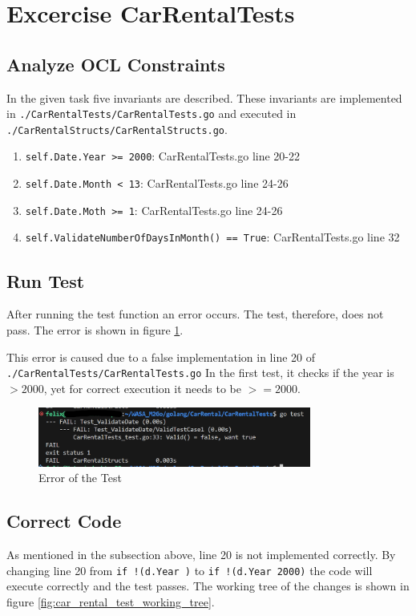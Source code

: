 \section{Excercise CarRentalTests}
\subsection*{Analyze OCL Constraints}
In the given task five invariants are described.
These invariants are implemented in \texttt{./CarRentalTests/CarRentalTests.go} and executed in \texttt{./CarRentalStructs/CarRentalStructs.go}.
\begin{enumerate}
    \item \texttt{self.Date.Year >= 2000}: CarRentalTests.go line 20-22
    \item \texttt{self.Date.Month < 13}: CarRentalTests.go line 24-26
    \item \texttt{self.Date.Moth >= 1}: CarRentalTests.go line 24-26
    \item \texttt{self.ValidateNumberOfDaysInMonth() == True}: CarRentalTests.go line 32
\end{enumerate}

\subsection*{Run Test}
After running the test function an error occurs. 
The test, therefore, does not pass.
The error is shown in figure \ref{fig:car_rental_test_error}.

This error is caused due to a false implementation in line 20 of \texttt{./CarRentalTests/CarRentalTests.go}
In the first test, it checks if the year is $>2000$, yet for correct execution it needs to be $>=2000$.

\begin{figure}[H]
    \centering
    \includegraphics[width=0.8\textwidth]{figures/goLang/carRental/carRental_dateTestError.png}
    \caption{Error of the Test}
    \label{fig:car_rental_test_error}
\end{figure}

\subsection*{Correct Code}
As mentioned in the subsection above, line 20 is not implemented correctly.
By changing line 20 from \texttt{if !(d.Year )} to \texttt{if !(d.Year \>\= 2000)} the code will execute correctly and the test passes.
The working tree of the changes is shown in figure \ref{fig:car_rental_test_working_tree}.

